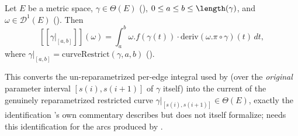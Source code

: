 \begin{lemma}
  Let $E$ be a metric space, $\gamma \in \Theta(E)$ (), $0 \le a \le b \le
  \length(\gamma)$, and $\omega \in \mathcal{D}^1(E)$ (). Then
  \[
    [[\gamma|_{[a,b]}]](\omega) = \int_a^b \omega.f(\gamma(t)) \cdot \mathrm{deriv}(\omega.\pi\circ\gamma)(t)\,dt
    ,
  \]
  where $\gamma|_{[a,b]} = \mathrm{curveRestrict}(\gamma,a,b)$ ().

  This converts the un-reparametrized per-edge integral used by
   (over the \emph{original} parameter interval $[s(i),s(i+1)]$
  of $\gamma$ itself) into the current of the genuinely reparametrized restricted curve
  $\gamma|_{[s(i),s(i+1)]} \in \Theta(E)$, exactly the identification
  's own commentary describes but does not itself formalize;
   needs this identification for the arcs produced by
  .
\end{lemma}
